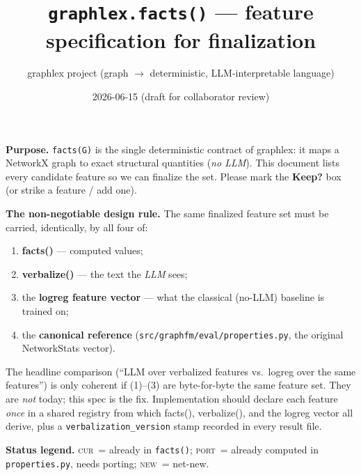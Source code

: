 \documentclass[11pt]{article}
\title{\texttt{graphlex.facts()} --- feature specification for finalization}
\author{graphlex project (graph $\rightarrow$ deterministic, LLM-interpretable language)}
\date{2026-06-15 (draft for collaborator review)}
\newcommand{\cur}{{\footnotesize\textsc{cur}}}   %
\newcommand{\prt}{{\footnotesize\textsc{port}}}  %
\newcommand{\nw}{{\footnotesize\textsc{new}}}    %
\begin{document}
\maketitle

\noindent\textbf{Purpose.} \texttt{facts(G)} is the single deterministic contract of
graphlex: it maps a NetworkX graph to exact structural quantities (\emph{no LLM}). This
document lists every candidate feature so we can finalize the set. Please mark the
\textbf{Keep?} box (or strike a feature / add one).

\medskip
\noindent\textbf{The non-negotiable design rule.} The same finalized feature set must be
carried, identically, by all four of:
\begin{enumerate}\itemsep0pt
  \item \textbf{facts()} --- computed values;
  \item \textbf{verbalize()} --- the text the \emph{LLM} sees;
  \item the \textbf{logreg feature vector} --- what the classical (no-LLM) baseline is trained on;
  \item the \textbf{canonical reference} (\texttt{src/graphfm/eval/properties.py}, the original NetworkStats vector).
\end{enumerate}
The headline comparison (``LLM over verbalized features vs.\ logreg over the same
features'') is only coherent if (1)--(3) are byte-for-byte the same feature set. They are
\emph{not} today; this spec is the fix. Implementation should declare each feature
\emph{once} in a shared registry from which facts(), verbalize(), and the logreg vector
all derive, plus a \texttt{verbalization\_version} stamp recorded in every result file.

\medskip
\noindent\textbf{Status legend.} \cur~= already in \texttt{facts()}; \prt~= already
computed in \texttt{properties.py}, needs porting; \nw~= net-new.
\end{document}
